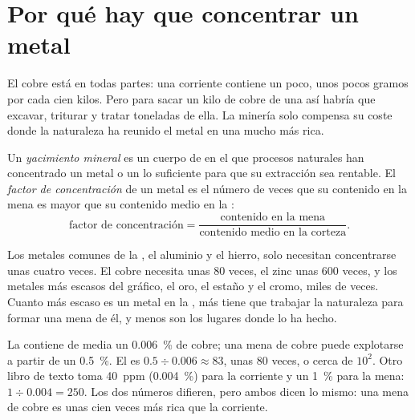 \section{Por qué hay que concentrar un metal}

El cobre está en todas partes: una  corriente contiene un poco, unos
pocos gramos por cada cien kilos. Pero para sacar un kilo de cobre de una
 así habría que excavar, triturar y tratar toneladas de ella. La
minería solo compensa su coste donde la naturaleza ha reunido el metal en
una  mucho más rica.

\begin{definition}\label{def:g9:earth-resources:ore-deposit}
Un \emph{yacimiento mineral} es un cuerpo de
 en el que procesos naturales han concentrado un metal o un  lo
suficiente para que su extracción sea rentable. El \emph{factor de
concentración} de
un metal es el número de veces que su contenido en la mena es mayor que su
contenido medio en la :
\[
\text{factor de concentración} = \frac{\text{contenido en la mena}}{\text{contenido medio en la corteza}} .
\]
\end{definition}

Los metales comunes de la , el aluminio y el hierro, solo necesitan
concentrarse unas cuatro veces. El cobre necesita unas 80 veces, el zinc
unas 600 veces, y los metales más escasos del gráfico, el oro, el estaño y
el cromo, miles de veces. Cuanto más escaso es un metal en la , más
tiene que trabajar la naturaleza para formar una mena de él, y menos son
los lugares donde lo ha hecho.

\begin{example}[El cobre]
La  contiene de media un \qty{0.006}{\%} de cobre; una mena de
cobre puede explotarse a partir de un \qty{0.5}{\%}. El  es $0.5 \div 0.006
\approx 83$, unas 80 veces, o cerca de $10^2$. Otro libro de texto toma
\qty{40}{ppm} (\qty{0.004}{\%}) para la  corriente y un \qty{1}{\%}
para la mena: $1 \div
0.004 = 250$. Los dos números difieren, pero ambos dicen lo mismo: una
mena de cobre es unas cien veces más rica que la  corriente.
\end{example}

